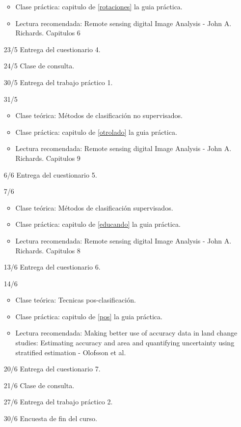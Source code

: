 \begin{itemize}
\begin{itemize}
    \item Clase pr\'actica: capitulo de \ref{rotaciones} la guia pr\'actica.
    \item Lectura recomendada: Remote sensing digital Image Analysis - John A. Richards. Capitulos 6
  \end{itemize}
  \item[23/5] Entrega del cuestionario 4.
  \item[24/5] Clase de consulta.
  \item[30/5] Entrega del trabajo pr\'actico 1.
  \item[31/5] 
  \begin{itemize}
    \item Clase te\'orica: M\'etodos de clasificaci\'on no supervisados.
    \item Clase pr\'actica: capitulo de \ref{otrolado} la guia pr\'actica.
    \item Lectura recomendada: Remote sensing digital Image Analysis - John A. Richards. Capitulos 9
  \end{itemize}
  \item[6/6] Entrega del cuestionario 5.
  \item[7/6] 
  \begin{itemize}
    \item Clase te\'orica: M\'etodos de clasificaci\'on supervisados.
    \item Clase pr\'actica: capitulo de \ref{educando} la guia pr\'actica.
    \item Lectura recomendada: Remote sensing digital Image Analysis - John A. Richards. Capitulos 8
  \end{itemize}
  \item[13/6] Entrega del cuestionario 6.
  \item[14/6] 
  \begin{itemize}
    \item Clase te\'orica: Tecnicas pos-clasificaci\'on.
    \item Clase pr\'actica: capitulo de \ref{pos} la guia pr\'actica.
    \item Lectura recomendada: Making better use of accuracy data in land change studies: Estimating accuracy and area and quantifying uncertainty using stratified estimation - Olofsson et al.
  \end{itemize}
  \item[20/6] Entrega del cuestionario 7.
  \item[21/6] Clase de consulta.
  \item[27/6] Entrega del trabajo pr\'actico 2.
  \item[30/6] Encuesta de fin del curso.
\end{itemize}

